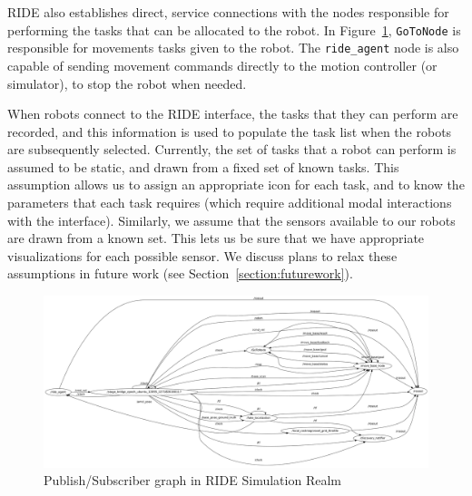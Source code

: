 RIDE also establishes direct, service connections with the nodes responsible for performing the tasks that can be allocated to the robot. In Figure~\ref{fig:ride-simulation-realm}, \verb!GoToNode! is responsible for movements tasks given to the robot. The \verb!ride_agent! node is also capable of sending movement commands directly to the motion controller (or simulator), to stop the robot when needed.

When robots connect to the RIDE interface, the tasks that they can perform are recorded, and this information is used to populate the task list when the robots are subsequently selected. Currently, the set of tasks that a robot can perform is assumed to be static, and drawn from a fixed set of known tasks. This assumption allows us to assign an appropriate icon for each task, and to know the parameters that each task requires (which require additional modal interactions with the interface). Similarly, we assume that the sensors available to our robots are drawn from a known set. This lets us be sure that we have appropriate visualizations for each possible sensor. We discuss plans to relax these assumptions in future work (see Section~\ref{section:futurework}).

\begin{figure}
\includegraphics[width=\textwidth]{images/ride-simulation-realm.png}
\caption{Publish/Subscriber graph in RIDE Simulation Realm\label{fig:ride-simulation-realm}}
\end{figure}


